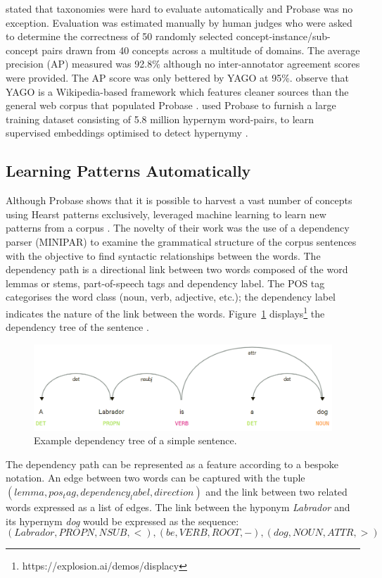 \citeauthor{camacho2017we} stated that taxonomies were hard to evaluate automatically \citep{camacho2017we} and Probase was no exception.  Evaluation was estimated manually by human judges who were asked to determine the correctness of 50 randomly selected concept-instance/sub-concept pairs drawn from 40 concepts across a multitude of domains.  The average precision (AP) measured was 92.8\% although no inter-annotator agreement scores were provided.  The AP score was only bettered by YAGO \citep{suchanek2007yago} at 95\%.  \citeauthor{wu2012probase} observe that YAGO is a Wikipedia-based framework which features cleaner sources than the general web corpus that populated Probase \citep{wu2012probase}.  \citeauthor{yu2015learning} used Probase to furnish a large training dataset consisting of 5.8 million hypernym word-pairs, to learn supervised embeddings optimised to detect hypernymy \citep{yu2015learning}.

\subsection{Learning Patterns Automatically} \label{Learning Patterns Automatically}
Although Probase shows that it is possible to harvest a vast number of concepts using Hearst patterns \citep{hearst1992automatic} exclusively, \citeauthor{Snow2004} leveraged machine learning to learn new patterns from a corpus \citep{Snow2004}.  The novelty of their work was the use of a dependency parser (MINIPAR) to examine the grammatical structure of the corpus sentences with the objective to find syntactic relationships between the words.  The dependency path is a directional link between two words composed of the word lemmas or stems, part-of-speech tags and dependency label.  The \ac{POS} tag categorises the word class (noun, verb, adjective, etc.); the dependency label indicates the nature of the link between the words.  Figure~\ref{fig:simple_dep_tree} displays\footnote{https://explosion.ai/demos/displacy} the dependency tree of the sentence .
\begin{figure}[ht!] %
  \centering
  \includegraphics[width=1.\linewidth]{images/dependency_parse.png}
  \caption{Example dependency tree of a simple sentence.}
  \label{fig:simple_dep_tree}
\end{figure}
The dependency path can be represented as a feature according to a bespoke notation.  An edge between two words can be captured with the tuple $(lemma, pos_tag, dependency_label, direction)$ and the link between two related words expressed as a list of edges.  The link between the hyponym \textit{Labrador} and its hypernym \textit{dog} would be expressed as the sequence:
\[(Labrador, PROPN, NSUB, <), (be, VERB, ROOT, -),(dog, NOUN, ATTR, >)\]


